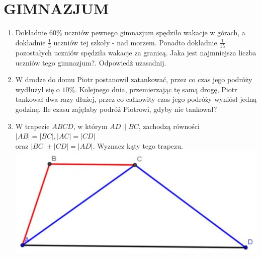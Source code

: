 \documentclass[10pt]{article}
\begin{document}
\section*{GIMNAZJUM}
\begin{enumerate}
  \item Dokładnie \(60 \%\) uczniów pewnego gimnazjum spędziło wakacje w górach, a dokładnie \(\frac{1}{3}\) uczniów tej szkoły - nad morzem. Ponadto dokładnie \(\frac{1}{15}\) pozostałych uczniów spędziła wakacje za granicą. Jaka jest najmniejsza liczba uczniów tego gimnazjum?. Odpowiedź uzasadnij.
  \item W drodze do domu Piotr postanowił zatankować, przez co czas jego podróży wydłużył się o \(10 \%\). Kolejnego dnia, przemierzając tę samą drogę, Piotr tankował dwa razy dłużej, przez co całkowity czas jego podróży wyniósł jedną godzinę. Ile czasu zajęłaby podróż Piotrowi, gdyby nie tankował?
  \item W trapezie \(A B C D\), w którym \(A D \| B C\), zachodzą równości \(|A B|=|B C|,|A C|=|C D|\)\\
oraz \(|B C|+|C D|=|A D|\). Wyznacz kąty tego trapezu.\\
\includegraphics[max width=\textwidth, center]{2024_11_21_ba1800e73998f6feb233g-1(1)}
\end{enumerate}
\end{document}
